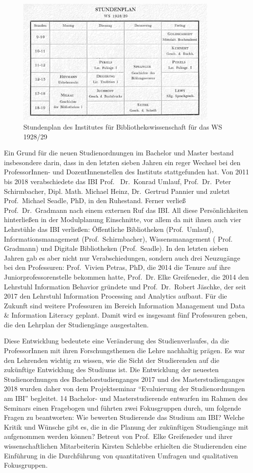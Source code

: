 \documentclass[a4paper,
fontsize=11pt,
oneside,
numbers=noperiodatend,
parskip=half-,
bibliography=totoc,
final
]{scrartcl}
\begin{document}
\begin{figure}
\centering
\includegraphics[width=10cm]{img/Abb1.jpg}
\caption{Stundenplan des Institutes für Bibliothekswissenschaft für das
WS 1928/29}
\end{figure}

Ein Grund für die neuen Studienordnungen im Bachelor und Master bestand
insbesondere darin, dass in den letzten sieben Jahren ein reger Wechsel
bei den ProfessorInnen- und DozentInnenstellen des Instituts
stattgefunden hat. Von 2011 bis 2018 verabschiedete das IBI Prof.~
Dr.~Konrad Umlauf, Prof.~Dr.~Peter Schirmbacher, Dipl. Math. Michael
Heinz, Dr.~Gertrud Pannier und zuletzt Prof.~Michael Seadle, PhD, in den
Ruhestand. Ferner verließ Prof.~Dr.~Gradmann nach einem externen Ruf das
IBI. All diese Persönlichkeiten hinterließen in der Modulplanung
Einschnitte, vor allem da mit ihnen auch vier Lehrstühle das IBI
verließen: Öffentliche Bibliotheken (Prof.~Umlauf),
Informationsmanagement (Prof.~Schirmbacher), Wissensmanagement (
Prof. Gradmann) und Digitale Bibliotheken (Prof.~Seadle). In den letzten
sieben Jahren gab es aber nicht nur Verabschiedungen, sondern auch drei
Neuzugänge bei den Professuren: Prof.~Vivien Petras, PhD, die 2014 die
Tenure auf ihre Juniorprofessorenstelle bekommen hatte, Prof.~Dr. Elke
Greifeneder, die 2014 den Lehrstuhl Information Behavior gründete und
Prof.~Dr.~Robert Jäschke, der seit 2017 den Lehrstuhl Information
Processing and Analytics aufbaut. Für die Zukunft sind weitere
Professuren im Bereich Information Management und Data \& Information
Literacy geplant. Damit wird es insgesamt fünf Professuren geben, die
den Lehrplan der Studiengänge ausgestalten.

Diese Entwicklung bedeutete eine Veränderung des Studienverlaufes, da
die ProfessorInnen mit ihren Forschungsthemen die Lehre nachhaltig
prägen. Es war den Lehrenden wichtig zu wissen, wie die Sicht der
Studierenden auf die zukünftige Entwicklung des Studiums ist. Die
Entwicklung der neuesten Studienordnungen des Bachelorstudienganges 2017
und des Masterstudienganges 2018 wurden daher von dem Projektseminar
\enquote{Evaluierung der Studienordnungen am IBI} begleitet. 14
Bachelor- und Masterstudierende entwarfen im Rahmen des Seminars einen
Fragebogen und führten zwei Fokusgruppen durch, um folgende Fragen zu
beantworten: Wie bewerten Studierende das Studium am IBI? Welche Kritik
und Wünsche gibt es, die in die Planung der zukünftigen Studiengänge mit
aufgenommen werden können? Betreut von Prof.~Elke Greifeneder und ihrer
wissenschaftlichen Mitarbeiterin Kirsten Schlebbe erhielten die
Studierenden eine Einführung in die Durchführung von quantitativen
Umfragen und qualitativen Fokusgruppen.
\end{document}
